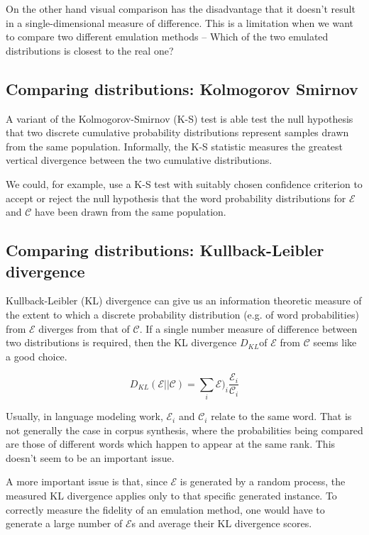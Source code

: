 \documentclass[11pt]{report}
\newcommand{\script}[1]{$\mathcal{#1}$}
\begin{document}
On the other hand visual comparison has the disadvantage that it
doesn't result in a single-dimensional measure of difference.  This is
a limitation when we want to compare two different emulation methods
-- Which of the two emulated distributions is closest to the real one?


\subsection{Comparing distributions: Kolmogorov Smirnov}
A variant of the Kolmogorov-Smirnov (K-S) test is able test the null
hypothesis that two discrete cumulative probability distributions represent
samples drawn from the same population.  Informally, the K-S statistic
measures the greatest vertical divergence between the two cumulative
distributions.

We could, for example, use a K-S test with suitably chosen confidence
criterion to accept or reject the null
hypothesis that the word probability distributions for \script{E} and
\script{C} have been drawn from the same population.



\subsection{Comparing distributions: Kullback-Leibler divergence}

Kullback-Leibler (KL) divergence can give us an information theoretic
measure of the extent to which a discrete probability distribution (e.g. of word
probabilities) from \script{E} diverges from that of \script{C}.  If a
single number measure of difference between two distributions is
required, then the KL divergence $D_{KL}$of \script{E} from \script{C}
seems like a good choice.  

\[ D_{KL}(\mathscr{E}||\mathscr{C}) = \sum_i \mathscr{E})_i\frac{\mathscr{E}_i}{\mathscr{C}_i} \]

Usually, in language modeling work, $\mathscr{E}_i$ and $\mathscr{C}_i$
relate to the same word. That is not generally the case in corpus
synthesis, where the probabilities being compared are those of
different words which happen to appear at the same rank.  This doesn't
seem to be an important issue.

A more important issue is that, since \script{E} is generated by a random
process, the measured KL divergence applies
only to that specific generated instance.  To correctly measure the
fidelity of an emulation method, one would have to generate a large
number of \script{E}s and average their KL divergence scores.
\end{document}
